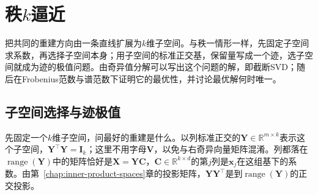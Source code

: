 
\section{秩\texorpdfstring{$k$}{k}逼近}
\label{sec:ls-low-rank-approximation}
\label{sec:ls-low-rank-solve}
\label{sec:ls-full-svd-solve}
\label{sec:matrix-analysis-svd-low-rank}

把共同的重建方向由一条直线扩展为$k$维子空间。与秩一情形一样，先固定子空间求系数，再选择子空间本身；用子空间的标准正交基，保留量写成一个迹，选子空间就成为迹的极值问题。由奇异值分解可以写出这个问题的解，即截断SVD；随后在Frobenius范数与谱范数下证明它的最优性，并讨论最优解何时唯一。

\subsection{子空间选择与迹极值}
\label{sec:ls-low-rank-projection-error}
\label{sec:ls-rank-k-trace}

先固定一个$k$维子空间，问最好的重建是什么。以列标准正交的$\bm Y\in\mathbb R^{m\times k}$表示这个子空间，$\bm Y^\top\bm Y=\bm I_k$；这里不用字母$\bm V$，以免与右奇异向量矩阵混淆。列都落在$\operatorname{range}(\bm Y)$中的矩阵恰好是$\bm X=\bm Y\bm C$，$\bm C\in\mathbb R^{k\times d}$的第$j$列是$\bm x_j$在这组基下的系数。由第~\ref{chap:inner-product-spaces}章的投影矩阵，$\bm Y\bm Y^\top$是到$\operatorname{range}(\bm Y)$的正交投影。

